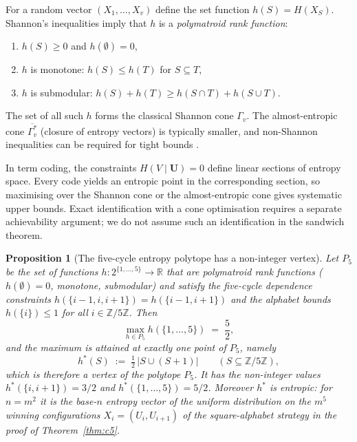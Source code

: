\documentclass[11pt]{article}
\theoremstyle{plain}
\newtheorem{proposition}[theorem]{Proposition}
\theoremstyle{definition}
\theoremstyle{definition}
\theoremstyle{remark}
\begin{document}
For a random vector $(X_1,\dots,X_v)$ define the set function $h(S)=H(X_S)$.
Shannon's inequalities imply that $h$ is a \emph{polymatroid rank function}:
\begin{enumerate}[leftmargin=2.2em]
\item $h(S)\ge 0$ and $h(\emptyset)=0$,
\item $h$ is monotone: $h(S)\le h(T)$ for $S\subseteq T$,
\item $h$ is submodular: $h(S)+h(T)\ge h(S\cap T)+h(S\cup T)$.
\end{enumerate}
The set of all such $h$ forms the classical Shannon cone $\Gamma_v$.
The almost-entropic cone $\overline{\Gamma_v^*}$ (closure of entropy vectors) is typically smaller,
and non-Shannon inequalities can be required for tight bounds
\cite{zhang1997non,baber2016graph}.

In term coding, the constraints $H(V\mid\mathbf U)=0$ define linear sections of entropy space.
Every code yields an entropic point in the corresponding section, so maximising over the Shannon cone or the
almost-entropic cone gives systematic upper bounds.  Exact identification with a cone optimisation requires a
separate achievability argument; we do not assume such an identification in the sandwich theorem.

\begin{proposition}[The five-cycle entropy polytope has a non-integer vertex]
\label{prop:c5-vertex}
Let $P_5$ be the set of functions $h:2^{\{1,\dots,5\}}\to\mathbb R$ that are polymatroid rank
functions ($h(\emptyset)=0$, monotone, submodular) and satisfy the five-cycle dependence
constraints $h(\{i-1,i,i+1\})=h(\{i-1,i+1\})$ and the alphabet bounds $h(\{i\})\le 1$ for all
$i\in\mathbb Z/5\mathbb Z$.
Then
\[
  \max_{h\in P_5} h(\{1,\dots,5\})\;=\;\frac52,
\]
and the maximum is attained at exactly one point of $P_5$, namely
\[
  h^*(S)\;:=\;\tfrac12\,\bigl|S\cup(S+1)\bigr|\qquad(S\subseteq\mathbb Z/5\mathbb Z),
\]
which is therefore a vertex of the polytope $P_5$.  It has the non-integer values
$h^*(\{i,i+1\})=3/2$ and $h^*(\{1,\dots,5\})=5/2$.
Moreover $h^*$ is entropic: for $n=m^2$ it is the base-$n$ entropy vector of the uniform
distribution on the $m^5$ winning configurations $X_i=(U_i,U_{i+1})$ of the square-alphabet
strategy in the proof of Theorem~\ref{thm:c5}.
\end{proposition}
\end{document}
